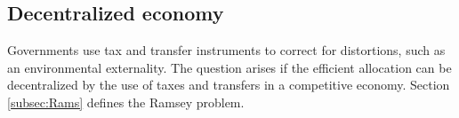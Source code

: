 \subsection{Decentralized economy}\label{subsec:decen_ec}

Governments use tax and transfer instruments to correct for distortions, such as an environmental externality. The question arises if the efficient allocation can be decentralized by the use of taxes and transfers in a competitive economy. Section \ref{subsec:Rams} defines the Ramsey problem. %



